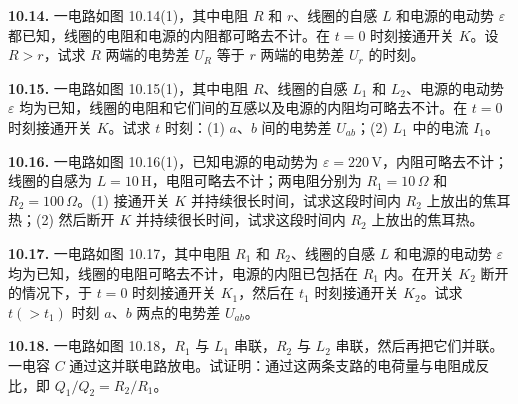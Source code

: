 \vfill
\newpage

\textbf{10.14.} 一电路如图 10.14(1)，其中电阻 $R$ 和 $r$、线圈的自感 $L$ 和电源的电动势 $\varepsilon$ 都已知，线圈的电阻和电源的内阻都可略去不计。在 $t = 0$ 时刻接通开关 $K$。设 $R > r$，试求 $R$ 两端的电势差 $U_R$ 等于 $r$ 两端的电势差 $U_r$ 的时刻。

\begin{center}
\end{center}

\vfill
\newpage

\textbf{10.15.} 一电路如图 10.15(1)，其中电阻 $R$、线圈的自感 $L_1$ 和 $L_2$、电源的电动势 $\varepsilon$ 均为已知，线圈的电阻和它们间的互感以及电源的内阻均可略去不计。在 $t = 0$ 时刻接通开关 $K$。试求 $t$ 时刻：(1) $a$、$b$ 间的电势差 $U_{ab}$；(2) $L_1$ 中的电流 $I_1$。

\begin{center}
\end{center}

\vfill
\newpage

\textbf{10.16.} 一电路如图 10.16(1)，已知电源的电动势为 $\varepsilon = 220\,\mathrm{V}$，内阻可略去不计；线圈的自感为 $L = 10\,\mathrm{H}$，电阻可略去不计；两电阻分别为 $R_1 = 10\,\Omega$ 和 $R_2 = 100\,\Omega$。(1) 接通开关 $K$ 并持续很长时间，试求这段时间内 $R_2$ 上放出的焦耳热；(2) 然后断开 $K$ 并持续很长时间，试求这段时间内 $R_2$ 上放出的焦耳热。

\begin{center}
\end{center}

\vfill
\newpage

\textbf{10.17.} 一电路如图 10.17，其中电阻 $R_1$ 和 $R_2$、线圈的自感 $L$ 和电源的电动势 $\varepsilon$ 均为已知，线圈的电阻可略去不计，电源的内阻已包括在 $R_1$ 内。在开关 $K_2$ 断开的情况下，于 $t = 0$ 时刻接通开关 $K_1$，然后在 $t_1$ 时刻接通开关 $K_2$。试求 $t(>t_1)$ 时刻 $a$、$b$ 两点的电势差 $U_{ab}$。

\begin{center}
\end{center}

\vfill
\newpage

\textbf{10.18.} 一电路如图 10.18，$R_1$ 与 $L_1$ 串联，$R_2$ 与 $L_2$ 串联，然后再把它们并联。一电容 $C$ 通过这并联电路放电。试证明：通过这两条支路的电荷量与电阻成反比，即 $Q_1/Q_2 = R_2/R_1$。

